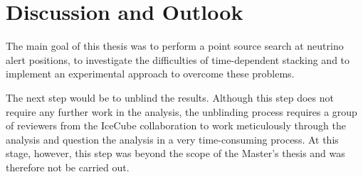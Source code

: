 %

\section{Discussion and Outlook}

The main goal of this thesis was to perform a point source search at neutrino alert positions, to investigate the difficulties of time-dependent stacking and to implement an experimental approach to overcome these problems.

The next step would be to unblind the results.
Although this step does not require any further work in the analysis, the unblinding process requires a group of reviewers from the IceCube collaboration to work meticulously through the analysis and question the analysis in a very time-consuming process.
At this stage, however, this step was beyond the scope of the Master's thesis and was therefore not be carried out.

